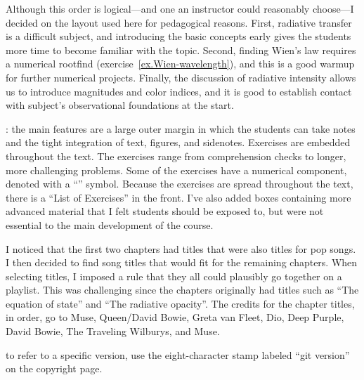 Although this order is logical---and one an instructor could reasonably choose---I decided on the layout used here for pedagogical reasons. First, radiative transfer is a difficult subject, and introducing the basic concepts early gives the students more time to become familiar with the topic. Second, finding Wien's law requires a numerical rootfind (exercise~\ref{ex.Wien-wavelength}), and this is a good warmup for further numerical projects. Finally, the discussion of radiative intensity allows us to introduce magnitudes and color indices, and it is good to establish contact with subject's observational foundations at the start.

: the main features are a large outer margin in which the students can take notes and the tight integration of text, figures, and sidenotes. Exercises are embedded throughout the text. The exercises range from comprehension checks to longer, more challenging problems. Some of the exercises have a numerical component, denoted with a ``\notebook'' symbol. Because the exercises are spread throughout the text, there is a ``List of Exercises'' in the front. I've also added boxes containing more advanced material that I felt students should be exposed to, but were not essential to the main development of the course. 

 I noticed that the first two chapters had titles that were also titles for pop songs. I then decided to find song titles that would fit for the remaining chapters. When selecting titles, I imposed a rule that they all could plausibly go together on a playlist. This was challenging since the chapters originally had titles such as ``The equation of state'' and ``The radiative opacity''. The credits for the chapter titles, in order, go to Muse, Queen/David Bowie, Greta van Fleet, Dio, Deep Purple, David Bowie, The Traveling Wilburys, and Muse.

 to refer to a specific version, use the eight-character stamp labeled ``git version'' on the copyright page.

